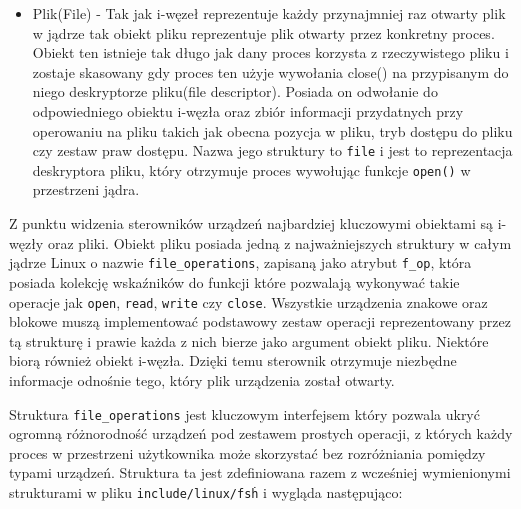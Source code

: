 \documentclass[10pt]{article}
\begin{document}
\begin{itemize}
\item
  Plik(File) - Tak jak i-węzeł reprezentuje każdy przynajmniej raz otwarty plik w jądrze tak obiekt pliku reprezentuje plik otwarty przez konkretny proces. Obiekt ten istnieje tak długo jak dany proces korzysta z rzeczywistego pliku i zostaje skasowany gdy proces ten użyje wywołania close() na przypisanym do niego deskryptorze pliku(file descriptor). Posiada on odwołanie do odpowiedniego obiektu i-węzła oraz zbiór informacji przydatnych przy operowaniu na pliku takich jak obecna pozycja w pliku, tryb dostępu do pliku czy zestaw praw dostępu. Nazwa jego struktury to \texttt{file} i jest to reprezentacja deskryptora pliku, który otrzymuje proces wywołując funkcje \texttt{open()} w przestrzeni jądra.
\end{itemize}

Z punktu widzenia sterowników urządzeń najbardziej kluczowymi obiektami są i-węzły oraz pliki. Obiekt pliku posiada jedną z najważniejszych struktury w całym jądrze Linux o nazwie \texttt{file\_operations}, zapisaną jako atrybut \texttt{f\_op}, która posiada kolekcję wskaźników do funkcji które pozwalają wykonywać takie operacje jak \texttt{open}, \texttt{read}, \texttt{write} czy \texttt{close}. Wszystkie urządzenia znakowe oraz blokowe muszą implementować podstawowy zestaw operacji reprezentowany przez tą strukturę i prawie każda z nich bierze jako argument obiekt pliku. Niektóre biorą również obiekt i-węzła. Dzięki temu sterownik otrzymuje niezbędne informacje odnośnie tego, który plik urządzenia został otwarty.

Struktura \texttt{file\_operations} jest kluczowym interfejsem który pozwala ukryć ogromną różnorodność urządzeń pod zestawem prostych operacji, z których każdy proces w przestrzeni użytkownika może skorzystać bez rozróżniania pomiędzy typami urządzeń. Struktura ta jest zdefiniowana razem z wcześniej wymienionymi strukturami w pliku \texttt{include/linux/fs\.h} i wygląda następująco:
\end{document}
